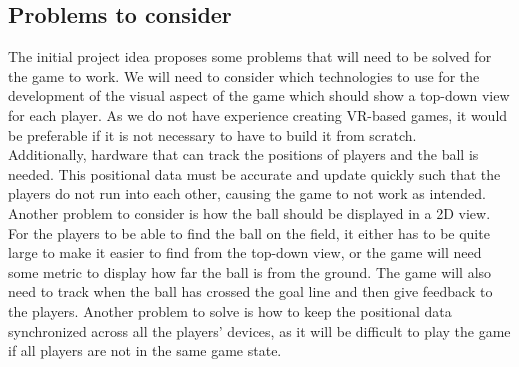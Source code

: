 \subsection{Problems to consider}
The initial project idea proposes some problems that will need to be solved for the game to work.
We will need to consider which technologies to use for the development of the visual aspect of the game which should show a top-down view for each player. 
As we do not have experience creating VR-based games, it would be preferable if it is not necessary to have to build it from scratch.\\
Additionally, hardware that can track the positions of players and the ball is needed.
This positional data must be accurate and update quickly such that the players do not run into each other, causing the game to not work as intended.
Another problem to consider is how the ball should be displayed in a 2D view.
For the players to be able to find the ball on the field, it either has to be quite large to make it easier to find from the top-down view, or the game will need some metric to display how far the ball is from the ground.
The game will also need to track when the ball has crossed the goal line and then give feedback to the players.
Another problem to solve is how to keep the positional data synchronized across all the players' devices, as it will be difficult to play the game if all players are not in the same game state.
